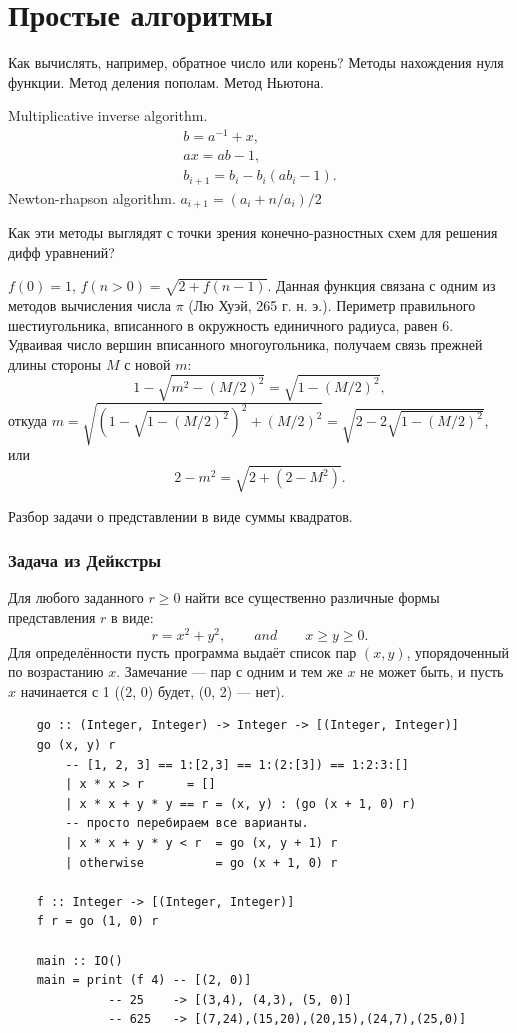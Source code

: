\documentclass{book}
\begin{document}
\section{Простые алгоритмы}

Как вычислять, например, обратное число или корень?
Методы нахождения нуля функции. Метод деления пополам. Метод Ньютона.

Multiplicative inverse algorithm.
\begin{eqnarray}
    b = a^{-1} + x, \\
    ax = ab - 1, \\
    b_{i + 1} = b_i - b_i (ab_i - 1).
\end{eqnarray}
Newton-rhapson algorithm.
$a_{i+1} = (a_i + n / a_i) / 2$

Как эти методы выглядят с точки зрения конечно-разностных схем для решения дифф уравнений?

  $f(0) = 1$, $f(n>0) = \sqrt{2 + f(n - 1)}$. Данная функция связана с
   одним из методов вычисления числа $\pi$ (Лю Хуэй, 265 г. н. э.). Периметр
   правильного шестиугольника, вписанного в окружность единичного радиуса, равен
   $6$. Удваивая число вершин вписанного многоугольника, получаем связь прежней
   длины стороны $M$ с новой $m$:
   \begin{equation}
     1 - \sqrt{m^2 - (M / 2)^2} = \sqrt{1 - (M / 2)^2},
   \end{equation}
   откуда $m = \sqrt{\left(1 - \sqrt{1 - (M / 2)^2}\right)^2 + (M / 2)^2} =
   \sqrt{2 - 2\sqrt{1 - (M / 2)^2}}$, или
   \begin{equation}
     2 - m^2 = \sqrt{2 + (2 - M^2)}.
   \end{equation}


Разбор задачи о представлении в виде суммы квадратов.

\subsubsection{Задача из Дейкстры}
Для любого заданного $r \geq 0$ найти все существенно различные формы представления $r$ в виде:
\begin{equation}
    r = x^2 + y^2, \qquad and \qquad x \geq y \geq 0.
\end{equation}
Для определённости пусть программа выдаёт список пар $(x, y)$, упорядоченный по возрастанию $x$.
Замечание --- пар с одним и тем же $x$ не может быть, и пусть $x$ начинается с 1 ((2, 0) будет,
(0, 2) --- нет).
\begin{verbatim}
    go :: (Integer, Integer) -> Integer -> [(Integer, Integer)]
    go (x, y) r
        -- [1, 2, 3] == 1:[2,3] == 1:(2:[3]) == 1:2:3:[]
        | x * x > r      = []
        | x * x + y * y == r = (x, y) : (go (x + 1, 0) r)
        -- просто перебираем все варианты.
        | x * x + y * y < r  = go (x, y + 1) r
        | otherwise          = go (x + 1, 0) r

    f :: Integer -> [(Integer, Integer)]
    f r = go (1, 0) r

    main :: IO()
    main = print (f 4) -- [(2, 0)]
              -- 25    -> [(3,4), (4,3), (5, 0)]
              -- 625   -> [(7,24),(15,20),(20,15),(24,7),(25,0)]
\end{verbatim}
\end{document}

